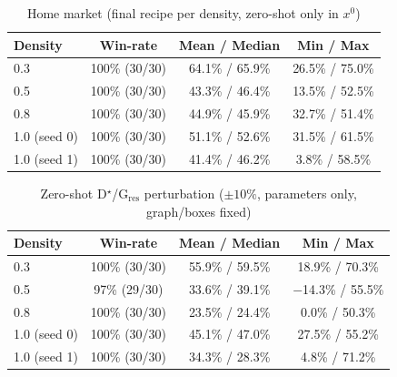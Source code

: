 
\begin{table}[h]
\centering
\caption{Home market (final recipe per density, zero-shot only in $x^0$)}
\label{tab:home-market}
\begin{tabular}{lccc}
\toprule
Density & Win-rate & Mean / Median & Min / Max \\
\midrule
0.3          & 100\% (30/30) & 64.1\% / 65.9\% & 26.5\% / 75.0\% \\
0.5          & 100\% (30/30) & 43.3\% / 46.4\% & 13.5\% / 52.5\% \\
0.8          & 100\% (30/30) & 44.9\% / 45.9\% & 32.7\% / 51.4\% \\
1.0 (seed 0) & 100\% (30/30) & 51.1\% / 52.6\% & 31.5\% / 61.5\% \\
1.0 (seed 1) & 100\% (30/30) & 41.4\% / 46.2\% &  3.8\% / 58.5\% \\
\bottomrule
\end{tabular}
\end{table}


\begin{table}[h]
\centering
\caption{Zero-shot D$^\star$/G$_{\mathrm{res}}$ perturbation ($\pm10\%$, parameters only, graph/boxes fixed)}
\label{tab:dstar-gres}
\begin{tabular}{lccc}
\toprule
Density & Win-rate & Mean / Median & Min / Max \\
\midrule
0.3          & 100\% (30/30) & 55.9\% / 59.5\% & 18.9\% / 70.3\% \\
0.5          &  97\% (29/30) & 33.6\% / 39.1\% & $-$14.3\% / 55.5\% \\
0.8          & 100\% (30/30) & 23.5\% / 24.4\% &   0.0\% / 50.3\% \\
1.0 (seed 0) & 100\% (30/30) & 45.1\% / 47.0\% &  27.5\% / 55.2\% \\
1.0 (seed 1) & 100\% (30/30) & 34.3\% / 28.3\% &   4.8\% / 71.2\% \\
\bottomrule
\end{tabular}
\end{table}


